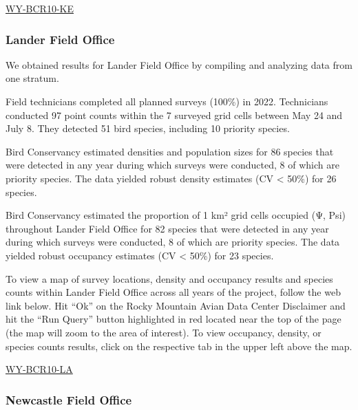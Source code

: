 \documentclass[
  letterpaper,
  DIV=11,
  numbers=noendperiod,
  oneside]{scrreprt}
\begin{document}
\href{http://www.rmbo.org/new_site/adc/QueryWindow.aspx\#N4IgzgLgTghhCuBbEAuABCA6gTQLQCEBhAJQEYAGXAaQFF194oBTGeNAewDM0AZGAOwAmaALICYAcyaIm/CGlxoq0mcyhoAYgEsmAG2EB5Tpy0BjJiAC+QA=}{WY-BCR10-KE}

\hypertarget{lander-field-office}{%
\subsubsection{Lander Field Office}\label{lander-field-office}}

We obtained results for Lander Field Office by compiling and analyzing
data from one stratum.

Field technicians completed all planned surveys (100\%) in 2022.
Technicians conducted 97 point counts within the 7 surveyed grid cells
between May 24 and July 8. They detected 51 bird species, including 10
priority species.

Bird Conservancy estimated densities and population sizes for 86 species
that were detected in any year during which surveys were conducted, 8 of
which are priority species. The data yielded robust density estimates
(CV \textless{} 50\%) for 26 species.

Bird Conservancy estimated the proportion of 1 km² grid cells occupied
(Ψ, Psi) throughout Lander Field Office for 82 species that were
detected in any year during which surveys were conducted, 8 of which are
priority species. The data yielded robust occupancy estimates (CV
\textless{} 50\%) for 23 species.

To view a map of survey locations, density and occupancy results and
species counts within Lander Field Office across all years of the
project, follow the web link below. Hit ``Ok'' on the Rocky Mountain
Avian Data Center Disclaimer and hit the ``Run Query'' button
highlighted in red located near the top of the page (the map will zoom
to the area of interest). To view occupancy, density, or species counts
results, click on the respective tab in the upper left above the map.

\href{http://www.rmbo.org/new_site/adc/QueryWindow.aspx\#N4IgzgLgTghhCuBbEAuABCA6gTQLQCEBhAJQEYAGXAGQEF194oBTGeNAewDM0qYA7ACZoAsvxgBzJoiZ8IaXD34CmUNADEAlkwA2QgPKdOGgMZMQAXyA}{WY-BCR10-LA}

\hypertarget{newcastle-field-office}{%
\subsubsection{Newcastle Field Office}\label{newcastle-field-office}}
\end{document}

